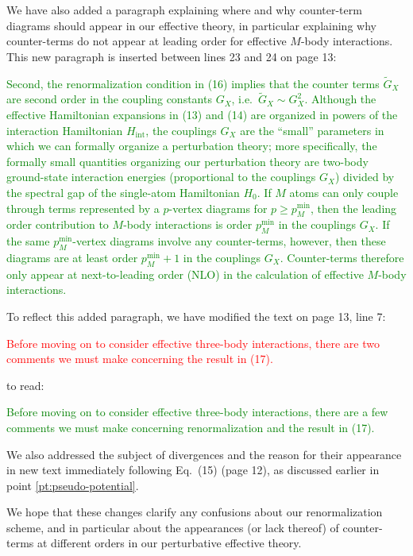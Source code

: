 \documentclass[preprint]{revtex4-1}
\renewcommand{\t}{\text} %
\newcommand{\1}{\mathds{1}}
\newcommand{\red}[1]{\textcolor{red}{#1}}
\newcommand{\green}[1]{\textcolor{green}{#1}}
\begin{document}
\begin{enumerate}
  We have also added a paragraph explaining where and why counter-term
  diagrams should appear in our effective theory, in particular
  explaining why counter-terms do not appear at leading order for
  effective $M$-body interactions.  This new paragraph is inserted
  between lines 23 and 24 on page 13:

  \green{Second, the renormalization condition in (16) implies that
    the counter terms $\tilde G_X$ are second order in the coupling
    constants $G_X$, i.e.~$\tilde G_X\sim G_X^2$.  Although the
    effective Hamiltonian expansions in (13) and (14) are organized in
    powers of the interaction Hamiltonian $H_{\t{int}}$, the couplings
    $G_X$ are the ``small'' parameters in which we can formally
    organize a perturbation theory; more specifically, the formally
    small quantities organizing our perturbation theory are two-body
    ground-state interaction energies (proportional to the couplings
    $G_X$) divided by the spectral gap of the single-atom Hamiltonian
    $H_0$.  If $M$ atoms can only couple through terms represented by
    a $p$-vertex diagrams for $p\ge p_M^{\t{min}}$, then the leading
    order contribution to $M$-body interactions is order
    $p_M^{\t{min}}$ in the couplings $G_X$.  If the same
    $p_M^{\t{min}}$-vertex diagrams involve any counter-terms,
    however, then these diagrams are at least order $p_M^{\t{min}}+1$
    in the couplings $G_X$.  Counter-terms therefore only appear at
    next-to-leading order (NLO) in the calculation of effective
    $M$-body interactions.}

  To reflect this added paragraph, we have modified the text on page
  13, line 7:

  \red{Before moving on to consider effective three-body interactions,
    there are two comments we must make concerning the result in
    (17).}

  to read:

  \green{Before moving on to consider effective three-body
    interactions, there are a few comments we must make concerning
    renormalization and the result in (17).}

  We also addressed the subject of divergences and the reason for
  their appearance in new text immediately following Eq.~(15) (page
  12), as discussed earlier in point \ref{pt:pseudo-potential}.

  We hope that these changes clarify any confusions about our
  renormalization scheme, and in particular about the appearances (or
  lack thereof) of counter-terms at different orders in our
  perturbative effective theory.



\end{enumerate}
\end{document}
